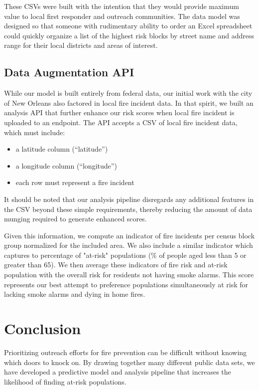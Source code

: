 \documentclass{sig-alternate}
\begin{document}
These CSVs were built with the intention that they would provide maximum value to local first responder and outreach communities. The data model was designed so that someone with rudimentary ability to order an Excel spreadsheet could quickly organize a list of the highest risk blocks by street name and address range for their local districts and areas of interest.

\subsection{Data Augmentation API}
While our model is built entirely from federal data, our initial work with the city of New Orleans also factored in local fire incident data. In that spirit, we built an analysis API that further enhance our risk scores when local fire incident is uploaded to an endpoint. The API accepts a CSV of local fire incident data, which must include:
\begin{itemize}
\item a latitude column (``latitude'')
\item a longitude column (``longitude'')
\item each row must represent a fire incident
\end{itemize}

It should be noted that our analysis pipeline disregards any additional features in the CSV beyond these simple requirements, thereby reducing the amount of data munging required to generate enhanced scores.

Given this information, we compute an indicator of fire incidents per census block group normalized for the included area. We also include a similar indicator which captures to percentage of "at-risk" populations (\% of people aged less than 5 or greater than 65). We then average these indicators of fire risk and at-risk population with the overall risk for residents not having smoke alarms.  This score represents our best attempt to preference populations simultaneously at risk for lacking smoke alarms and dying in home fires.

\section{Conclusion}

Prioritizing outreach efforts for fire prevention can be difficult without knowing which doors to knock on. By drawing together many different public data sets, we have developed a predictive model and analysis pipeline that increases the likelihood of finding at-risk populations.
\end{document}
